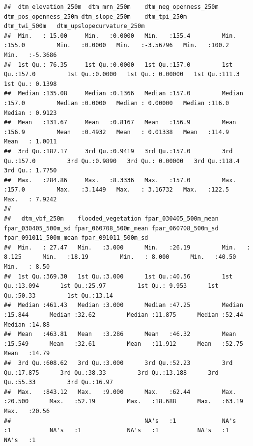 \documentclass[
  10pt,
  b5paper,
  oneside]{book}
\begin{document}
\begin{verbatim}
##  dtm_elevation_250m  dtm_mrn_250m    dtm_neg_openness_250m dtm_pos_openness_250m dtm_slope_250m    dtm_tpi_250m       dtm_twi_500m   dtm_upslopecurvature_250m
##  Min.   : 15.00     Min.   :0.0000   Min.   :155.4         Min.   :155.0         Min.   :0.0000   Min.   :-3.56796   Min.   :100.2   Min.   :-5.3686          
##  1st Qu.: 76.35     1st Qu.:0.0000   1st Qu.:157.0         1st Qu.:157.0         1st Qu.:0.0000   1st Qu.: 0.00000   1st Qu.:111.3   1st Qu.: 0.1398          
##  Median :135.08     Median :0.1366   Median :157.0         Median :157.0         Median :0.0000   Median : 0.00000   Median :116.0   Median : 0.9123          
##  Mean   :131.67     Mean   :0.8167   Mean   :156.9         Mean   :156.9         Mean   :0.4932   Mean   : 0.01338   Mean   :114.9   Mean   : 1.0011          
##  3rd Qu.:187.17     3rd Qu.:0.9419   3rd Qu.:157.0         3rd Qu.:157.0         3rd Qu.:0.9890   3rd Qu.: 0.00000   3rd Qu.:118.4   3rd Qu.: 1.7750          
##  Max.   :284.86     Max.   :8.3336   Max.   :157.0         Max.   :157.0         Max.   :3.1449   Max.   : 3.16732   Max.   :122.5   Max.   : 7.9242          
##                                                                                                                                                               
##   dtm_vbf_250m    flooded_vegetation fpar_030405_500m_mean fpar_030405_500m_sd fpar_060708_500m_mean fpar_060708_500m_sd fpar_091011_500m_mean fpar_091011_500m_sd
##  Min.   : 27.47   Min.   :3.000      Min.   :26.19         Min.   : 8.125      Min.   :18.19         Min.   : 8.000      Min.   :40.50         Min.   : 8.50      
##  1st Qu.:369.30   1st Qu.:3.000      1st Qu.:40.56         1st Qu.:13.094      1st Qu.:25.97         1st Qu.: 9.953      1st Qu.:50.33         1st Qu.:13.14      
##  Median :461.43   Median :3.000      Median :47.25         Median :15.844      Median :32.62         Median :11.875      Median :52.44         Median :14.88      
##  Mean   :463.81   Mean   :3.286      Mean   :46.32         Mean   :15.549      Mean   :32.61         Mean   :11.912      Mean   :52.75         Mean   :14.79      
##  3rd Qu.:608.62   3rd Qu.:3.000      3rd Qu.:52.23         3rd Qu.:17.875      3rd Qu.:38.33         3rd Qu.:13.188      3rd Qu.:55.33         3rd Qu.:16.97      
##  Max.   :843.12   Max.   :9.000      Max.   :62.44         Max.   :20.500      Max.   :52.19         Max.   :18.688      Max.   :63.19         Max.   :20.56      
##                                      NA's   :1             NA's   :1           NA's   :1             NA's   :1           NA's   :1             NA's   :1          

\end{verbatim}
\end{document}
